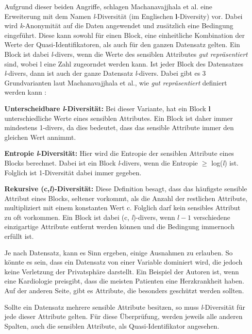 Aufgrund dieser beiden Angriffe, schlagen Machanavajjhala et al. \cite{P-24} eine Erweiterung mit dem Namen \textit{l}-Diversität (im Englischen \textbf{l}-Diversity) vor.
Dabei wird \textit{k}-Anonymität auf die Daten angewendet und zusätzlich eine Bedingung eingeführt. 
Diese kann sowohl für einen Block, eine einheitliche Kombination der Werte der Quasi-Identifikatoren, als auch für den ganzen Datensatz gelten.
Ein Block ist dabei \textit{l}-divers, wenn die Werte des sensiblen Attributes \textit{\dq gut repräsentiert\dq} sind, wobei l eine Zahl zugeorndet werden kann.
Ist jeder Block des Datensatzes \textit{l}-divers, dann ist auch der ganze Datensatz \textit{l}-divers.
Dabei gibt es 3 Grundvarianten laut Machanavajjhala et al., wie \textit{\dq gut repräsentiert\dq} definiert werden kann \cite{P-24}:
\begin{compactitem}
\item \textbf{Unterscheidbare \textit{l}-Diversität:} Bei dieser Variante, hat ein Block \textbf{l} unterschiedliche Werte eines sensiblen Attributes. Ein Block ist daher immer mindestens 1-divers, da dies bedeutet, dass das sensible Attribute immer den gleichen Wert annimmt.
\item \textbf{Entropie \textit{l}-Diversität:} Hier wird die Entropie der sensiblen Attribute eines Blocks berechnet. Dabei ist ein Block \textit{l}-divers, wenn die Entropie $\ge$ log(\textit{l}) ist. Folglich ist 1-Diversität dabei immer gegeben.
\item \textbf{Rekursive (c,\textit{l})-Diversität:} Diese Definition besagt, dass das häufigste sensible Attribut eines Blocks, seltener vorkommt, als die Anzahl der restlichen Attribute, multipliziert mit einem konstanten Wert c. Folglich darf kein sensibles Attribut zu oft vorkommen. Ein Block ist dabei (c, \textit{l})-divers, wenn $\textit{l} - 1$ verschiedene einzigartige Attribute entfernt werden können und die Bedingung immernoch erfüllt ist.
\end{compactitem}

Je nach Datensatz, kann es Sinn ergeben, einige Ausnahmen zu erlauben.
So könnte es sein, dass ein Datensatz von einer Variable dominiert wird, die jedoch keine Verletzung der Privatsphäre darstellt. 
Ein Beispiel der Autoren ist, wenn eine Kardiologie preisgibt, dass die meisten Patienten eine Herzkrankheit haben.
Auf der anderen Seite, gibt es Attribute, die besonders geschützt werden sollten.

Sollte ein Datensatz mehrere sensible Attribute besitzen, so muss \textit{l}-Diversität für jede dieser Attribute gelten. 
Für diese Überprüfung, werden jeweils alle anderen Spalten, auch die sensiblen Attribute, als Quasi-Identifikator angesehen.

